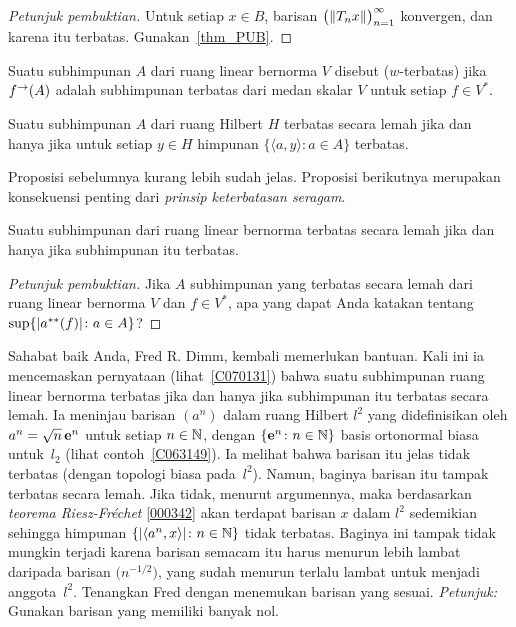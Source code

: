 \begin{proof}[\emph{Petunjuk pembuktian}] Untuk setiap $x \in B$, barisan $\bigl(\lVert T_nx\rVert\bigr)_{n=1}^\infty$
konvergen, dan karena itu terbatas. Gunakan~\ref{thm_PUB}.   \ns
\end{proof}

\begin{defn} Suatu subhimpunan $A$ dari ruang linear bernorma $V$ disebut
 ($w$-terbatas) jika $f^{\rightarrow}(A)$ adalah subhimpunan terbatas dari medan skalar
$V$ untuk setiap $f \in V^*$.
\end{defn}

\begin{prop} Suatu subhimpunan $A$ dari ruang Hilbert $H$ terbatas secara lemah jika dan hanya jika untuk setiap $y \in H$
himpunan $\{\langle a,y \rangle \colon a \in A\}$ terbatas.
\end{prop}

Proposisi sebelumnya kurang lebih sudah jelas. Proposisi berikutnya merupakan konsekuensi penting dari
\emph{prinsip keterbatasan seragam}.

\begin{prop}\label{C070131} Suatu subhimpunan dari ruang linear bernorma terbatas secara lemah jika dan hanya jika
subhimpunan itu terbatas.
\end{prop}

\begin{proof}[\emph{Petunjuk pembuktian}] Jika $A$ subhimpunan yang terbatas secara lemah dari ruang linear bernorma $V$
dan $f \in V^*$, apa yang dapat Anda katakan tentang $\sup\{\lvert a^{**}(f)\rvert\colon a \in A\}$?  \ns
\end{proof}

\begin{exer} Sahabat baik Anda, Fred R. Dimm, kembali memerlukan bantuan. Kali ini ia mencemaskan
pernyataan (lihat~\ref{C070131}) bahwa suatu subhimpunan ruang linear bernorma terbatas jika
dan hanya jika subhimpunan itu terbatas secara lemah. Ia meninjau barisan $(a^n)$ dalam ruang Hilbert
$l^2$ yang didefinisikan oleh $a^n = \sqrt{n}\,\mathbf{e}^n$ untuk setiap $n \in \mathbb{N}$, dengan $\{\mathbf{e}^n\colon n \in \mathbb{N}\}$ basis ortonormal biasa untuk~$l_2$ (lihat
contoh~\ref{C063149}). Ia melihat bahwa barisan itu jelas tidak terbatas (dengan topologi biasa
pada~$l^2$). Namun, baginya barisan itu tampak terbatas secara lemah. Jika tidak, menurut argumennya, maka
berdasarkan \emph{teorema Riesz-Fr\'echet} \ref{000342} akan terdapat barisan $x$ dalam
$l^2$ sedemikian sehingga himpunan $\{\lvert\langle a^n,x \rangle\rvert\colon n \in\mathbb{N}\}$ tidak terbatas. Baginya ini tampak
tidak mungkin terjadi karena barisan semacam itu harus menurun lebih lambat daripada
barisan $\bigl(n^{-1/2}\bigr)$, yang sudah menurun terlalu lambat untuk menjadi anggota~$l^2$.
Tenangkan Fred dengan menemukan barisan yang sesuai. \emph{Petunjuk:} Gunakan barisan yang
memiliki banyak nol.
\end{exer}

